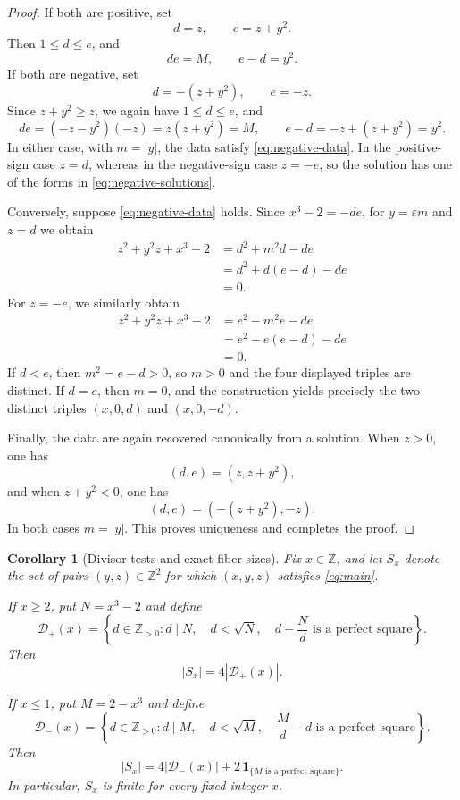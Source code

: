 \documentclass[11pt,a4paper]{amsart}
\newtheorem{corollary}[theorem]{Corollary}
\theoremstyle{remark}
\newcommand{\Z}{\mathbb Z}
\newcommand{\Zpos}{\mathbb Z_{>0}}
\newcommand{\eps}{\varepsilon}
\newcommand{\ind}{\mathbf 1}
\begin{document}
\begin{proof}
If both are positive, set
\[
 d=z,
 \qquad e=z+y^2.
\]
Then $1\leq d\leq e$, and
\[
 de=M,
 \qquad e-d=y^2.
\]
If both are negative, set
\[
 d=-(z+y^2),
 \qquad e=-z.
\]
Since $z+y^2\geq z$, we again have $1\leq d\leq e$, and
\[
 de=(-z-y^2)(-z)=z(z+y^2)=M,
 \qquad e-d=-z+(z+y^2)=y^2.
\]
In either case, with $m=|y|$, the data satisfy \eqref{eq:negative-data}.  In the positive-sign case $z=d$, whereas in the negative-sign case $z=-e$, so the solution has one of the forms in \eqref{eq:negative-solutions}.

Conversely, suppose \eqref{eq:negative-data} holds.  Since $x^3-2=-de$, for $y=\eps m$ and $z=d$ we obtain
\[
\begin{aligned}
 z^2+y^2z+x^3-2
 &=d^2+m^2d-de\\
 &=d^2+d(e-d)-de\\
 &=0.
\end{aligned}
\]
For $z=-e$, we similarly obtain
\[
\begin{aligned}
 z^2+y^2z+x^3-2
 &=e^2-m^2e-de\\
 &=e^2-e(e-d)-de\\
 &=0.
\end{aligned}
\]
If $d<e$, then $m^2=e-d>0$, so $m>0$ and the four displayed triples are distinct.  If $d=e$, then $m=0$, and the construction yields precisely the two distinct triples $(x,0,d)$ and $(x,0,-d)$.

Finally, the data are again recovered canonically from a solution.  When $z>0$, one has
\[
 (d,e)=(z,z+y^2),
\]
and when $z+y^2<0$, one has
\[
 (d,e)=(-(z+y^2),-z).
\]
In both cases $m=|y|$.  This proves uniqueness and completes the proof.
\end{proof}

\begin{corollary}[Divisor tests and exact fiber sizes]\label{cor:counting}
Fix $x\in\Z$, and let $S_x$ denote the set of pairs $(y,z)\in\Z^2$ for which $(x,y,z)$ satisfies \eqref{eq:main}.

If $x\geq 2$, put $N=x^3-2$ and define
\[
 \mathcal D_+(x)=
 \left\{
 d\in\Zpos:
 d\mid N,\quad d<\sqrt N,\quad
 d+\frac Nd\text{ is a perfect square}
 \right\}.
\]
Then
\begin{equation}\label{eq:count-positive}
 |S_x|=4|\mathcal D_+(x)|.
\end{equation}

If $x\leq 1$, put $M=2-x^3$ and define
\[
 \mathcal D_-(x)=
 \left\{
 d\in\Zpos:
 d\mid M,\quad d<\sqrt M,\quad
 \frac Md-d\text{ is a perfect square}
 \right\}.
\]
Then
\begin{equation}\label{eq:count-negative}
 |S_x|
 =4|\mathcal D_-(x)|
 +2\,\ind_{\{M\text{ is a perfect square}\}}.
\end{equation}
In particular, $S_x$ is finite for every fixed integer $x$.
\end{corollary}
\end{document}
